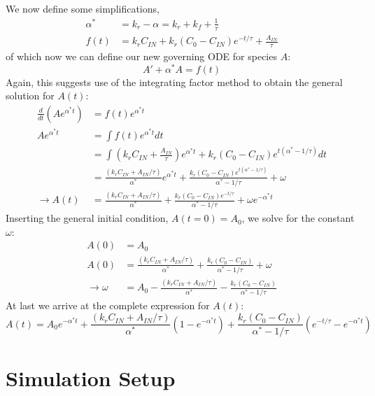 \documentclass[a4paper,12pt]{article}
\begin{document}
We now define some simplifications,
\begin{align}
    \alpha^* &= k_r - \alpha = k_r + k_f + \frac{1}{\tau}\\
    f(t) &= k_r C_{IN} + k_r(C_0 - C_{IN}) e^{-t/\tau} + \frac{A_{IN}}{\tau}
\end{align}
of which now we can define our new governing ODE for species $A$:
\begin{equation}
    A' + \alpha^* A = f(t)
\end{equation}
Again, this suggests use of the integrating factor method to obtain the general solution for $A(t)$:
\begin{align}
    \frac{d}{dt}(Ae^{\alpha^* t}) &= f(t)e^{\alpha^* t}\\
    Ae^{\alpha^* t} &= \int f(t)e^{\alpha^* t} dt\\
    &= \int \left(k_r C_{IN} + \frac{A_{IN}}{\tau}\right)e^{\alpha^* t} + k_r(C_0 - C_{IN}) e^{t(\alpha^* - 1/\tau)} dt\\
    &= \frac{\left(k_r C_{IN} + A_{IN}/\tau\right)}{\alpha^*}e^{\alpha^* t} + 
        \frac{k_r(C_0 - C_{IN}) e^{t(\alpha^* - 1/\tau)}}{\alpha^* - 1/\tau} + \omega\\
    \rightarrow A(t) &= \frac{\left(k_r C_{IN} + A_{IN}/\tau\right)}{\alpha^*} + 
        \frac{k_r(C_0 - C_{IN}) e^{-t/\tau}}{\alpha^* - 1/\tau} + \omega e^{-\alpha^* t}
\end{align}
Inserting the general initial condition, $A(t=0) = A_0$, we solve for the constant $\omega$:
\begin{align}
    A(0) &= A_0\\
    A(0) &= \frac{\left(k_r C_{IN} + A_{IN}/\tau\right)}{\alpha^*} + \frac{k_r(C_0 - C_{IN})}{\alpha^* - 1/\tau} + \omega \\
    \rightarrow \omega &= A_0 - \frac{\left(k_r C_{IN} + A_{IN}/\tau\right)}{\alpha^*} - \frac{k_r(C_0 - C_{IN})}{\alpha^* - 1/\tau}
\end{align}
At last we arrive at the complete expression for $A(t)$:
\begin{equation}
    A(t) = A_0e^{-\alpha^* t} + \frac{\left(k_r C_{IN} + A_{IN}/\tau\right)}{\alpha^*}\left(1-e^{-\alpha^* t}\right) + 
    \frac{k_r(C_0 - C_{IN})}{\alpha^* - 1/\tau}\left(e^{-t/\tau}-e^{-\alpha^* t}\right)
\end{equation}

\newpage 

\section{Simulation Setup}
\end{document}
